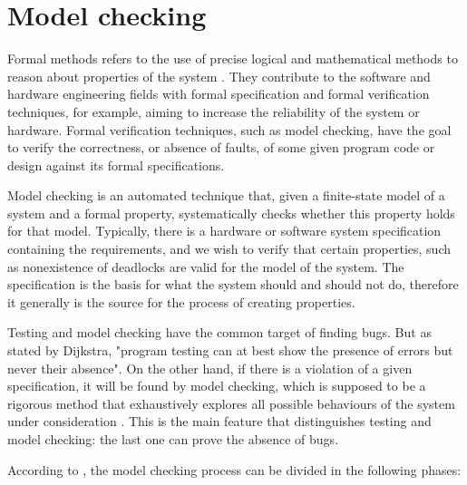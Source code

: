 \section{Model checking}
\label{sec-modelcheck}

Formal methods refers to the use of precise logical and mathematical methods to reason about properties of the system \cite{Eriksson}. They contribute to the software and hardware engineering fields with formal specification and formal verification techniques, for example, aiming to increase the reliability of the system or hardware. Formal verification techniques, such as model checking, have the goal to verify the correctness, or absence of faults, of some given program code or design against its formal specifications\cite{Tian}.

Model checking is an automated technique that, given a finite-state model of a system and a formal property, systematically checks whether this property holds for that model\cite{Baier}. Typically, there is a hardware or software system specification containing the requirements, and we wish to verify that certain properties, such as nonexistence of deadlocks are valid for the model of the system. The specification is the basis for what the system should and should not do, therefore it generally is the source for the process of creating properties.

Testing and model checking have the common target of finding bugs. But as stated by Dijkstra, "program testing can at best show the presence of errors but never their absence". On the other hand, if there is a violation of a given specification, it will be found by model checking, which is supposed to be a rigorous method that exhaustively explores all possible behaviours of the system under consideration \cite{testVsModelCheck}. This is the main feature that distinguishes testing and model checking: the last one can prove the absence of bugs\cite{patrice}.

According to \cite{Baier}, the model checking process can be divided in the following phases:

